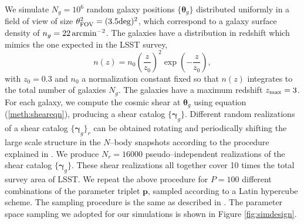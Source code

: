 \documentclass[reprint,aps,prd,superscriptaddress,showkeys,showpacs]{revtex4-1}
\newcommand{\bb}[1]{\mathbf{#1}}
\begin{document}
We simulate $N_g = 10^6$ random galaxy positions $\{\pmb{\theta}_g\}$ distributed uniformly in a field of view of size $\theta_{\rm FOV}^2=(3.5{\rm deg})^2$, which correspond to a galaxy surface density of $n_g=22\,\rm{arcmin}^{-2}$. The galaxies have a distribution in redshift which mimics the one expected in the LSST survey,
\begin{equation}
\label{meth:galdistr}
n(z) = n_0\left(\frac{z}{z_0}\right)^2\exp\left(-\frac{z}{z_0}\right) ,
\end{equation}  
%
with $z_0=0.3$ and $n_0$ a normalization constant fixed so that $n(z)$ integrates to the total number of galaxies $N_g$. The galaxies have a maximum redshift $z_{\rm max}=3$. For each galaxy, we compute the cosmic shear at $\pmb{\theta}_g$ using equation (\ref{meth:sheareqn}), producing a shear catalog $\{\pmb{\gamma}_g\}$. Different random realizations of a shear catalog $\{\pmb{\gamma}_g\}_r$ can be obtained rotating and periodically shifting the large scale structure in the $N$--body snapshots according to the procedure explained in \citep{PetriVariance}. We produce $N_r=16000$ pseudo--independent realizations of the shear catalog $\{\pmb{\gamma}_g\}$. These shear realizations all together cover 10 times the total survey area of LSST.
We repeat the above procedure for $P=100$ different combinations of the parameter triplet $\bb{p}$, sampled according to a Latin hypercube scheme. The sampling procedure is the same as described in \citep{CFHTMink,CFHTPeaks}. The parameter space sampling we adopted for our simulations is shown in Figure \ref{fig:simdesign}.
\end{document}

